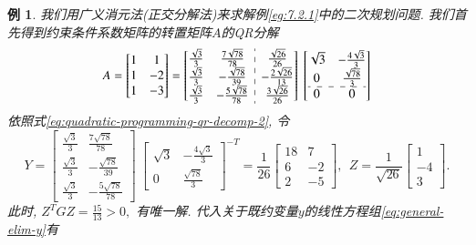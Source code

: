 \documentclass{SBCbookchapter}
\newtheorem{eg}[thm]{例}
\numberwithin{equation}{section}
\begin{document}
\begin{eg}
\label{eg:7.2.2}
我们用广义消元法(正交分解法)来求解例\eqref{eg:7.2.1}中的二次规划问题. 我们首先得到约束条件系数矩阵的转置矩阵$A$的QR分解
\begin{equation*}
A = \begin{bmatrix} 1 & 1 \\ 1 & -2 \\ 1 & -3 \end{bmatrix} = \left[\begin{array}{@{}cc:c@{}} \frac{\sqrt{3}}{3} & \frac{7 \sqrt{78}}{78} & \frac{\sqrt{26}}{26} \\ \frac{\sqrt{3}}{3} & - \frac{\sqrt{78}}{39} & - \frac{2 \sqrt{26}}{13} \\ \frac{\sqrt{3}}{3} & - \frac{5 \sqrt{78}}{78} & \frac{3 \sqrt{26}}{26} \end{array}\right] ~ \left[\begin{array}{@{}cc@{}} \sqrt{3} & - \frac{4 \sqrt{3}}{3} \\ 0 & \frac{\sqrt{78}}{3} \\ \hdashline 0 & 0 \end{array}\right]
\end{equation*}
依照式\eqref{eq:quadratic-programming-qr-decomp-2}, 令
\begin{equation*}
Y = \left[\begin{matrix} \frac{\sqrt{3}}{3} & \frac{7 \sqrt{78}}{78} \\ \frac{\sqrt{3}}{3} & - \frac{\sqrt{78}}{39} \\ \frac{\sqrt{3}}{3} & - \frac{5 \sqrt{78}}{78} \end{matrix}\right] ~ \left[\begin{matrix} \sqrt{3} & - \frac{4 \sqrt{3}}{3} \\ 0 & \frac{\sqrt{78}}{3} \end{matrix}\right]^{-T} = \frac{1}{26} \left[\begin{matrix} 18 & 7 \\ 6 & -2 \\ 2 & -5 \end{matrix}\right], ~~ Z = \frac{1}{\sqrt{26}} \left[\begin{matrix} 1 \\ -4 \\ 3 \end{matrix}\right].
\end{equation*}
此时, $Z^T G Z = \frac{15}{13} > 0,$ 有唯一解. 代入关于既约变量$y$的线性方程组\eqref{eq:general-elim-y}有
\begin{equation*}

\end{equation*}
\end{eg}
\end{document}

